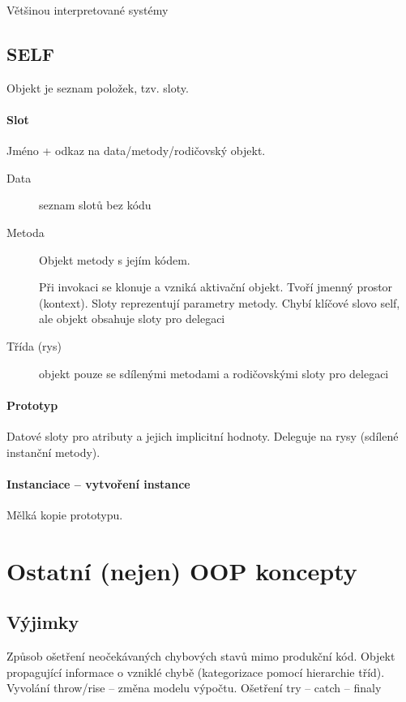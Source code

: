 \documentclass[a4paper, 11pt]{report}
\begin{document}
Většinou interpretované systémy

\subsection{SELF}

Objekt je seznam položek, tzv. sloty.

\paragraph{Slot} Jméno + odkaz na data/metody/rodičovský objekt.

\begin{description}
	\item[Data] seznam slotů bez kódu
	\item[Metoda] Objekt metody s jejím kódem.
	
	Při invokaci se klonuje a vzniká aktivační objekt. Tvoří jmenný prostor (kontext). Sloty reprezentují parametry metody. Chybí klíčové slovo self, ale objekt obsahuje sloty pro delegaci
	\item[Třída (rys)] objekt pouze se sdílenými metodami a rodičovskými sloty pro delegaci
\end{description}

\paragraph{Prototyp}
Datové sloty pro atributy a jejich implicitní hodnoty. Deleguje na rysy (sdílené instanční metody).

\paragraph{Instanciace -- vytvoření instance}
Mělká kopie prototypu.


\section{Ostatní (nejen) OOP koncepty}

\subsection{Výjimky}
Způsob ošetření neočekávaných chybových stavů mimo produkční kód. Objekt propagující informace o vzniklé chybě (kategorizace pomocí hierarchie tříd). Vyvolání throw/rise -- změna modelu výpočtu. Ošetření try -- catch -- finaly
\end{document}
